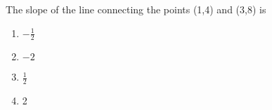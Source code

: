 \bigskip

\item The slope of the line connecting the points (1,4) and (3,8) is

\begin{enumerate}
\item $- \frac{1}{2}$ 
\item $-2$
\item $\frac{1}{2}$
\item 2
\end{enumerate}

